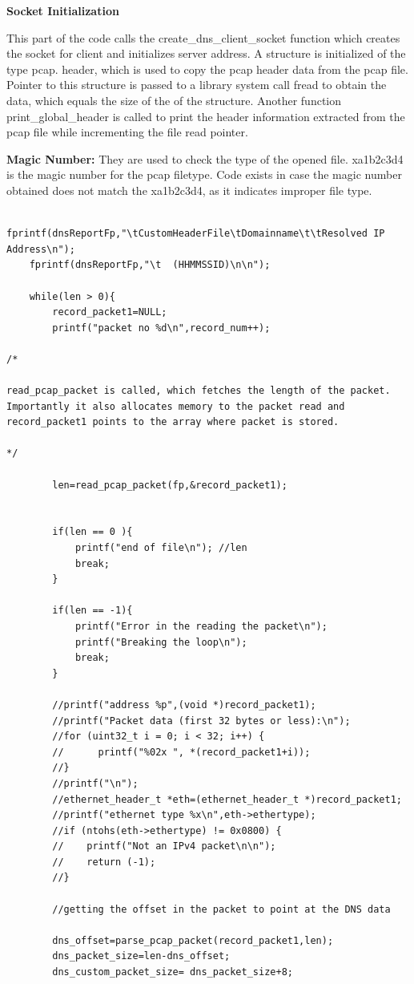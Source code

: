 \documentclass[12pt, a4paper]{report}
\begin{document}
\textbf{Socket Initialization}

This part of the code calls the create\_dns\_client\_socket function which creates the socket for client and initializes server address.
A structure is initialized of the type pcap. header, which is used to copy the pcap header data from the pcap file. Pointer to this structure is passed to a library system call fread to obtain the data, which equals the size of the of the structure.
Another function print\_global\_header is called to print the header information extracted from the pcap file while incrementing the file read pointer.

\textbf{Magic Number: } They are used to check the type of the opened file.
xa1b2c3d4 is the magic number for the pcap filetype. Code exists in case the magic number obtained does not match the xa1b2c3d4, as it indicates improper file type.


\begin{lstlisting}[caption={Iterating over the pcap file}]

fprintf(dnsReportFp,"\tCustomHeaderFile\tDomainname\t\tResolved IP Address\n");
    fprintf(dnsReportFp,"\t  (HHMMSSID)\n\n");
    
    while(len > 0){
        record_packet1=NULL;
        printf("packet no %d\n",record_num++);

/*

read_pcap_packet is called, which fetches the length of the packet.
Importantly it also allocates memory to the packet read and record_packet1 points to the array where packet is stored.

*/

        len=read_pcap_packet(fp,&record_packet1);


        if(len == 0 ){
            printf("end of file\n"); //len 
            break;
        }

        if(len == -1){
            printf("Error in the reading the packet\n");
            printf("Breaking the loop\n");
            break;
        }

        //printf("address %p",(void *)record_packet1);
        //printf("Packet data (first 32 bytes or less):\n");
        //for (uint32_t i = 0; i < 32; i++) {
        //      printf("%02x ", *(record_packet1+i));
        //}
        //printf("\n");
        //ethernet_header_t *eth=(ethernet_header_t *)record_packet1;
        //printf("ethernet type %x\n",eth->ethertype);
        //if (ntohs(eth->ethertype) != 0x0800) {
        //    printf("Not an IPv4 packet\n\n");
        //    return (-1);
        //}

        //getting the offset in the packet to point at the DNS data

        dns_offset=parse_pcap_packet(record_packet1,len);
        dns_packet_size=len-dns_offset;
        dns_custom_packet_size= dns_packet_size+8;


\end{lstlisting}
\end{document}
